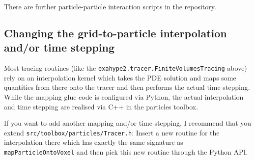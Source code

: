 \noindent
There are further particle-particle interaction scripts in the repository.


\subsection{Changing the grid-to-particle interpolation and/or time stepping}

Most tracing routines (like the \texttt{exahype2.tracer.FiniteVolumesTracing}
above) rely on an interpolation kernel which takes the PDE solution and maps 
some quantities from there onto the tracer and then performs the actual time
stepping.
While the mapping glue code is configured via Python, the actual interpolation
and time stepping are realised via C++ in the particles toolbox.


If you want to add another mapping and/or time stepping, I recommend that you 
extend \texttt{src/toolbox/particles/Tracer.h}:
Insert a new routine for the interpolation there which has exactly the same
signature as \texttt{mapParticleOntoVoxel} and then pick this new routine
through the Python API.




 


